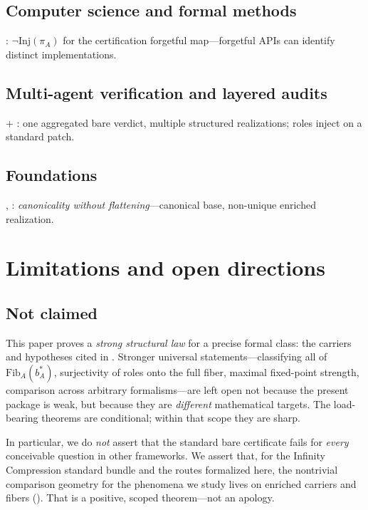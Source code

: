 \documentclass[11pt]{article}
\begin{document}
\subsection{Computer science and formal methods}\label{sec:significance-cs}
: $\neg\mathrm{Inj}(\pi_A)$ for the certification forgetful map---forgetful APIs can identify distinct implementations.

\subsection{Multi-agent verification and layered audits}\label{sec:significance-ai}
 + : one aggregated bare verdict, multiple structured realizations; roles inject on a standard patch.

\subsection{Foundations}\label{sec:significance-foundations}
, : \emph{canonicality without flattening}---canonical base, non-unique enriched realization.

\section{Limitations and open directions}\label{sec:limitations}

\subsection{Not claimed}\label{sec:limitations-not-claimed}
This paper proves a \emph{strong structural law} for a precise formal class: the carriers and hypotheses cited in . Stronger universal statements---classifying all of $\mathrm{Fib}_A(b^\ast_A)$, surjectivity of roles onto the full fiber, maximal fixed-point strength, comparison across arbitrary formalisms---are left open not because the present package is weak, but because they are \emph{different} mathematical targets. The load-bearing theorems are conditional; within that scope they are sharp.

\smallskip
\noindent In particular, we do \emph{not} assert that the standard bare certificate fails for \emph{every} conceivable question in other frameworks. We assert that, for the Infinity Compression standard bundle and the routes formalized here, the nontrivial comparison geometry for the phenomena we study lives on enriched carriers and fibers (). That is a positive, scoped theorem---not an apology.
\end{document}
